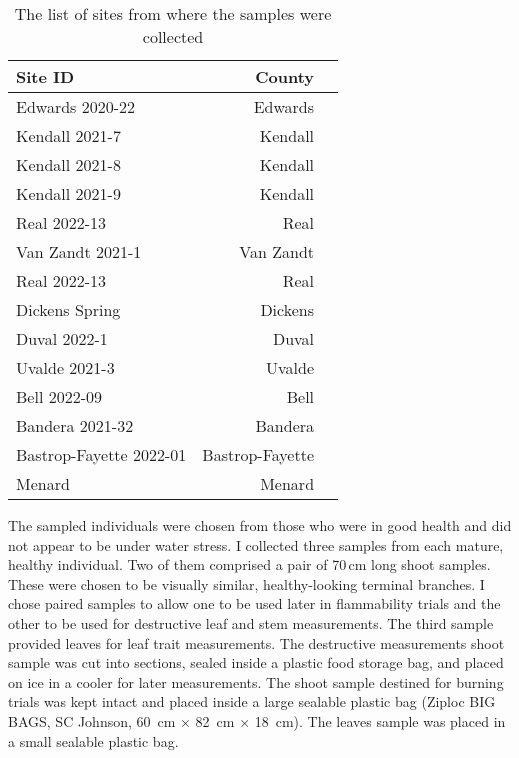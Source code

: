 \documentclass{ttuthes2007}
\begin{document}
\begin{table}
    \centering
    \caption{The list of sites from where the samples were collected}
    \begin{tabular}{lrr}
    \toprule
    Site ID & County\\
    \midrule
     Edwards 2020-22 & Edwards\\
     Kendall 2021-7    &  Kendall\\
     Kendall 2021-8   &  Kendall\\
     Kendall 2021-9   & Kendall\\
     Real 2022-13  & Real\\
     Van Zandt 2021-1 & Van Zandt\\
     Real 2022-13 & Real\\
     Dickens Spring & Dickens\\
     Duval 2022-1 & Duval\\
     Uvalde 2021-3 & Uvalde\\
     Bell 2022-09 & Bell\\
     Bandera 2021-32 & Bandera\\
     Bastrop-Fayette 2022-01 & Bastrop-Fayette\\
      Menard  & Menard\\
      \bottomrule
    \end{tabular}
    \label{tab:property list}
\end{table}





The sampled individuals were chosen from those who were in good health and did not appear to be under water stress. I collected three samples from each mature, healthy individual. Two of them comprised a pair of 70\,cm long shoot samples. These were chosen to be visually similar, healthy-looking terminal branches. I chose paired samples to allow one to be used later in flammability trials and the other to be used for destructive leaf and stem measurements. The third sample provided leaves for leaf trait measurements. %
The destructive measurements shoot sample was cut into sections, sealed inside a plastic food storage bag, and placed on ice in a cooler for later measurements. The shoot sample destined for burning trials was kept intact and placed inside a large sealable plastic bag (Ziploc BIG BAGS, SC Johnson, 60 \,cm × 82 \,cm × 18 \,cm). The leaves sample was placed in a small sealable plastic bag.
\end{document}
